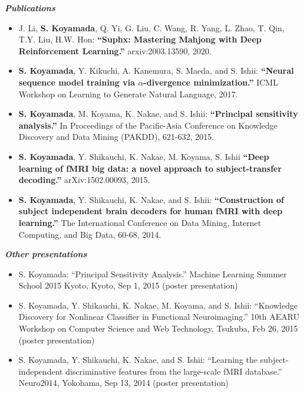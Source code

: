 \documentclass[margin, 10pt]{res} %
\begin{document}
\begin{resume}
{\sl {\bf Publications}} \vspace{0.5em}
\begin{itemize}
\item J. Li, {\bf S. Koyamada}, Q. Yi, G. Liu, C. Wang, R. Yang, L. Zhao, T. Qin, T.Y. Liu, H.W. Hon: {\bf ``Suphx: Mastering Mahjong with Deep Reinforcement Learning.''} arxiv:2003.13590, 2020.
\item {\bf S. Koyamada}, Y. Kikuchi, A. Kanemura, S. Maeda, and S. Ishii: {\bf ``Neural sequence model training via $\alpha$-divergence minimization.''} ICML Workshop on Learning to Generate Natural Language, 2017.
\item {\bf S. Koyamada}, M. Koyama, K. Nakae, and S. Ishii: {\bf ``Principal sensitivity analysis.''} In Proceedings of the Pacific-Asia Conference on Knowledge Discovery and Data Mining (PAKDD), 621-632, 2015.
\item {\bf S. Koyamada}, Y. Shikauchi, K. Nakae, M. Koyama, S. Ishii {\bf ``Deep learning of fMRI big data: a novel approach to subject-transfer decoding.''} arXiv:1502.00093, 2015.
\item {\bf S. Koyamada}, Y. Shikauchi, K. Nakae, and S. Ishii: {\bf ``Construction of subject independent brain decoders for human fMRI with deep learning.''} The International Conference on Data Mining, Internet Computing, and Big Data, 60-68, 2014.
\end{itemize}


{\sl {\bf Other presentations}} \vspace{0.5em}
\begin{itemize}
\item S. Koyamada: ``Principal Sensitivity Analysis.'' Machine Learning Summer School 2015 Kyoto, Kyoto, Sep 1, 2015 (poster presentation)
\item S. Koyamada, Y. Shikauchi, K. Nakae, M. Koyama, and S. Ishii: ``Knowledge Discovery for Nonlinear Classifier in Functional Neuroimaging.'' 10th AEARU Workshop on Computer Science and Web Technology, Tsukuba, Feb 26, 2015 (poster presentation)
\item S. Koyamada, Y. Shikauchi, K. Nakae, and S. Ishii: ``Learning the subject-independent discriminative features from the large-scale fMRI database.'' Neuro2014, Yokohama, Sep 13, 2014 (poster presentation)
\end{itemize}


\end{resume}
\end{document}

